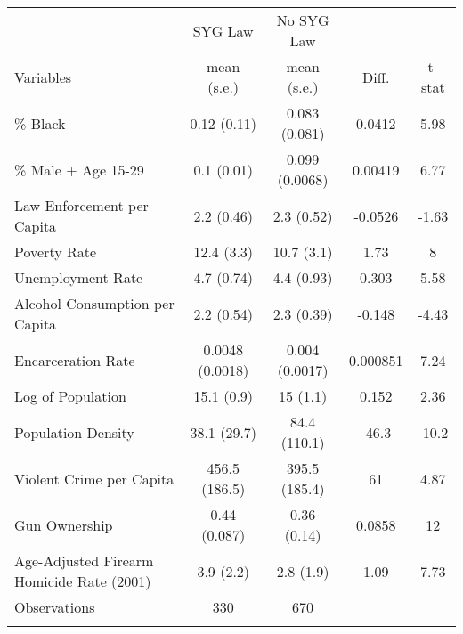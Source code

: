 \begin{tabular}{lcccc}
 &  &  &  & \tabularnewline
\hline
\hline
 &  SYG Law & No SYG Law \tabularnewline
Variables & mean (s.e.) & mean (s.e.) & Diff. & t-stat \tabularnewline
\hline
\% Black & 0.12 (0.11) & 0.083 (0.081) & 0.0412 & 5.98 \tabularnewline
\% Male + Age 15-29 & 0.1 (0.01) & 0.099 (0.0068) & 0.00419 & 6.77 \tabularnewline
Law Enforcement per Capita & 2.2 (0.46) & 2.3 (0.52) & -0.0526 & -1.63 \tabularnewline
Poverty Rate & 12.4 (3.3) & 10.7 (3.1) & 1.73 & 8 \tabularnewline
Unemployment Rate & 4.7 (0.74) & 4.4 (0.93) & 0.303 & 5.58 \tabularnewline
Alcohol Consumption per Capita & 2.2 (0.54) & 2.3 (0.39) & -0.148 & -4.43 \tabularnewline
Encarceration Rate & 0.0048 (0.0018) & 0.004 (0.0017) & 0.000851 & 7.24 \tabularnewline
Log of Population & 15.1 (0.9) & 15 (1.1) & 0.152 & 2.36 \tabularnewline
Population Density & 38.1 (29.7) & 84.4 (110.1) & -46.3 & -10.2 \tabularnewline
Violent Crime per Capita & 456.5 (186.5) & 395.5 (185.4) & 61 & 4.87 \tabularnewline
Gun Ownership & 0.44 (0.087) & 0.36 (0.14) & 0.0858 & 12 \tabularnewline
Age-Adjusted Firearm Homicide Rate (2001) & 3.9 (2.2) & 2.8 (1.9) & 1.09 & 7.73 \tabularnewline
Observations & 330 & 670 &  &  \tabularnewline
\hline
\hline
 &  &  &  & \tabularnewline
\end{tabular}
